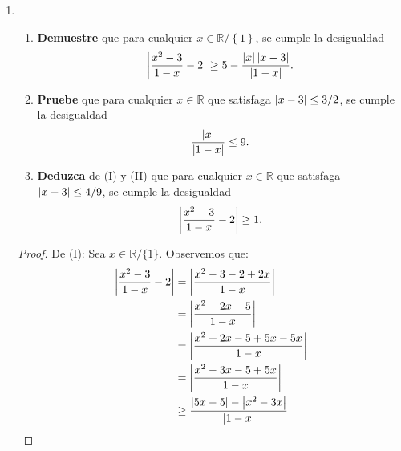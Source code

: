 \documentclass[12pt]{article}
\begin{document}
\begin{enumerate}
\begin{proof}
\begin{equation*}
\begin{split}
                \abs{\left(-x^3-2x^2+x+1\right)-\left(-3\right)}\geq&2-\abs{1-x^2}\abs{x+2}\\
                \geq&2-8\abs{x+2}\\
                \geq&2-8\frac{1}{8}\\
                =&2-1\\
                =&1\\
                \Rightarrow \abs{\left(-x^3-2x^2+x+1\right)-\left(-3\right)}\geq&1
            \end{split}
        \end{equation*}
        \qed
    \end{proof}
    \item \begin{enumerate}
        \item \textbf{Demuestre} que para cualquier $x\in\mathbb{R}/\left\{1\right\}$, se cumple la desigualdad
        \begin{equation*}
            \left| \frac{x^2-3}{1-x}-2 \right|\geq5-\frac{\left| x \right|\left| x-3 \right|}{\left| 1-x \right|}.
        \end{equation*}
        \item \textbf{Pruebe} que para cualquier $x\in\mathbb{R}$ que satisfaga $\left| x-3 \right|\leq3/2$, se cumple la desigualdad
        \begin{equation*}
            \frac{\left| x \right|}{\left| 1-x \right|}\leq9.
        \end{equation*}
        \item \textbf{Deduzca} de (I) y (II) que para cualquier $x\in\mathbb{R}$ que satisfaga $\left| x-3 \right|\leq4/9$, se cumple la desigualdad
        \begin{equation*}
            \left| \frac{x^2-3}{1-x}-2 \right|\geq1.
        \end{equation*}
    \end{enumerate}
    \begin{proof}
        De (I): Sea $x\in\mathbb{R}/\{1\}$. Observemos que:
        \begin{equation*}
            \begin{split}
                \abs{\frac{x^2-3}{1-x}-2}&=\abs{\frac{x^2-3-2+2x}{1-x}}\\
                &=\abs{\frac{x^2+2x-5}{1-x}}\\
                &=\abs{\frac{x^2+2x-5+5x-5x}{1-x}}\\
                &=\abs{\frac{x^2-3x-5+5x}{1-x}}\\
                &\geq\frac{\abs{5x-5}-\abs{x^2-3x}}{\abs{1-x}}\\

\end{split}
\end{equation*}
\end{proof}
\end{enumerate}
\end{document}
